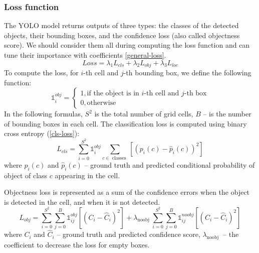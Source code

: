 \documentclass[14pt,a4paper]{extarticle}
\newcounter{e}
\numberwithin{equation}{section}
\numberwithin{figure}{section}
\begin{document}
\subsubsection{Loss function}
The YOLO model returns outputs of three types: the classes of the detected objects, their bounding boxes, and the confidence loss (also called objectness score). We should consider them all during computing the loss function \cite{yolo-overview} and can tune their importance with coefficients \ref{general-loss}.
\begin{equation}
\label{general-loss}
Loss=\lambda_1 L_{c l s}+\lambda_2 L_{o b j}+\lambda_3 L_{l o c}
\end{equation}
To compute the loss, for $i$-th cell and $j$-th bounding box, we define the following function:
\begin{equation}
\mathds{1}_i^{o b j} = \left\{
    \begin{array}{l}
       1, \text{if the object is in $i$-th cell and $j$-th box} \\
       0, \text{otherwise}
    \end{array}
\right.
\end{equation}
In the following formulas, $S^2$ is the total number of grid cells, $B$ -- is the number of bounding boxes in each cell. 
The classification loss is computed using binary cross entropy (\ref{cls-loss}):
\begin{equation}
\label{cls-loss}
L_{c l s} = \sum_{i=0}^{S^2} \mathds{1}_i^{o b j} \sum_{c \in \text { classes }}\left[\left(p_i(c)-\widehat{p}_i(c)\right)^2\right]
\end{equation}
where $p_i(c)$ and $\widehat{p}_i(c)$ -- ground truth and predicted conditional probability of object of class $c$ appearing in the cell.

Objectness loss is represented as a sum of the confidence errors when the object is detected in the cell, and when it is not detected.
\begin{equation}
L_{o b j} = \sum_{i=0}^{S^2} \sum_{j=0}^B \mathds{1}_{i j}^{o b j}\left[\left(C_i-\widehat{C}_i\right)^2\right] 
+
\lambda_{\text {noobj }} \sum_{i=0}^{S^2} \sum_{j=0}^B \mathds{1}_{i j}^{n o o b j}\left[\left(C_i-\widehat{C}_i\right)^2\right]
\end{equation}
where $C_i$ and $\widehat{C}_i$ -- ground truth and predicted confidence score, $\lambda_{\text {noobj }}$ -- the coefficient to decrease the loss for empty boxes.
\end{document}
